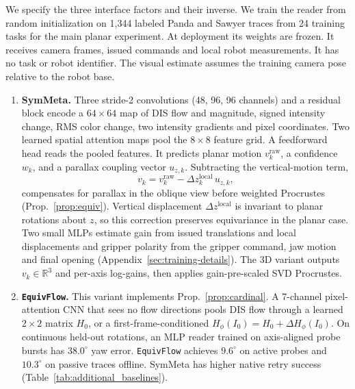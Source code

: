 \documentclass{article}
\theoremstyle{plain}
\theoremstyle{remark}
\begin{document}
We specify the three interface factors and their inverse. We train the reader from random initialization on 1,344 labeled Panda and Sawyer traces from 24 training tasks for the main planar experiment. At deployment its weights are frozen. It receives camera frames, issued commands and local robot measurements. It has no task or robot identifier. The visual estimate assumes the training camera pose relative to the robot base.
\begin{enumerate}
  \item \textbf{SymMeta.} Three stride-2 convolutions (48, 96, 96 channels) and a residual block encode a $64\!\times\!64$ map of DIS flow and magnitude, signed intensity change, RMS color change, two intensity gradients and pixel coordinates. Two learned spatial attention maps pool the $8\!\times\!8$ feature grid. A feedforward head reads the pooled features. It predicts planar motion $v_k^{\text{raw}}$, a confidence $w_k$, and a parallax coupling vector $u_{z,k}$. Subtracting the vertical-motion term,
  \[
    v_k = v_k^{\text{raw}} - \Delta z_k^{\text{local}}\, u_{z,k},
  \]
  compensates for parallax in the oblique view before weighted Procrustes (Prop.~\ref{prop:equiv}). Vertical displacement $\Delta z^{\text{local}}$ is invariant to planar rotations about $z$, so this correction preserves equivariance in the planar case. Two small MLPs estimate gain from issued translations and local displacements and gripper polarity from the gripper command, jaw motion and final opening (Appendix~\ref{sec:training-details}). The 3D variant outputs $v_k \in \mathbb{R}^3$ and per-axis log-gains, then applies gain-pre-scaled SVD Procrustes.
  \item \textbf{\texttt{EquivFlow}.} This variant implements Prop.~\ref{prop:cardinal}. A 7-channel pixel-attention CNN that sees no flow directions pools DIS flow through a learned $2\times 2$ matrix $H_0$, or a first-frame-conditioned $H_\phi(I_0) = H_0 + \Delta H_\phi(I_0)$. On continuous held-out rotations, an MLP reader trained on axis-aligned probe bursts has $38.0^\circ$ yaw error. \texttt{EquivFlow} achieves $9.6^\circ$ on active probes and $10.3^\circ$ on passive traces offline. SymMeta has higher native retry success (Table~\ref{tab:additional_baselines}).
\end{enumerate}
\end{document}
